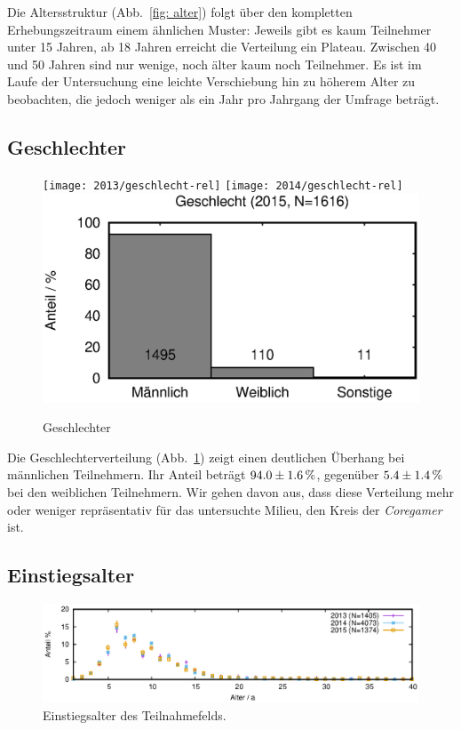 \documentclass[11pt]{scrartcl}
\begin{document}
Die Altersstruktur (Abb.~\ref{fig: alter}) folgt über
den kompletten Erhebungszeitraum einem	ähnlichen Muster:
Jeweils gibt es kaum Teilnehmer unter 15 Jahren,
ab 18 Jahren erreicht die Verteilung ein Plateau.
Zwischen 40 und 50 Jahren sind nur wenige, noch älter kaum noch Teilnehmer.
Es ist im Laufe der Untersuchung eine leichte Verschiebung hin zu höherem
Alter zu beobachten, die jedoch weniger als ein Jahr pro Jahrgang der Umfrage
beträgt.


\subsection{Geschlechter}

\begin{figure}[htb]
	\centering
	\texttt{[image: 2013/geschlecht-rel]}\hfill
	\texttt{[image: 2014/geschlecht-rel]}\hfill
	\includegraphics[width=0.33\linewidth]{2015/geschlecht-rel}
	\caption{Geschlechter}
	\label{fig: geschlecht}
\end{figure}

Die Geschlechterverteilung (Abb.~\ref{fig: geschlecht})
zeigt einen deutlichen Überhang bei männlichen Teilnehmern.
Ihr Anteil beträgt \(\unit[94.0\pm1.6]{\%}\),
gegenüber \(\unit[5.4\pm1.4]{\%}\) bei den weiblichen Teilnehmern.
Wir gehen davon aus, dass diese Verteilung mehr oder weniger repräsentativ
für das untersuchte Milieu, den Kreis der \emph{Coregamer} ist.


\subsection{Einstiegsalter}

\begin{figure}[htb]
	\centering
	\includegraphics[width=15cm]{vgl/einstiegsalter}
	\caption[Einstiegsalter]
	{Einstiegsalter des Teilnahmefelds.}
	\label{fig: einstiegsalter}
\end{figure}
\end{document}
